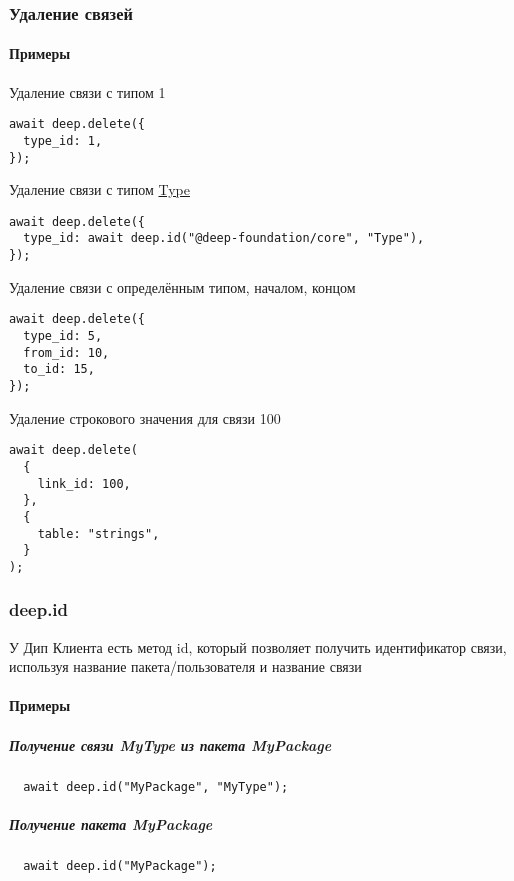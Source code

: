 \subsubsection{Удаление связей}

\paragraph{Примеры \\}

Удаление связи с типом 1

\leavevmode
\begin{lstlisting}
await deep.delete({
  type_id: 1,
});
\end{lstlisting}

Удаление связи с типом \hyperlink{Core.Type.Description}{Type}

\leavevmode
\begin{lstlisting}
await deep.delete({
  type_id: await deep.id("@deep-foundation/core", "Type"),
});
\end{lstlisting}

Удаление связи с определённым типом, началом, концом
\leavevmode
\begin{lstlisting}
await deep.delete({
  type_id: 5,
  from_id: 10,
  to_id: 15,
});
\end{lstlisting}

Удаление строкового значения для связи 100
\leavevmode
\begin{lstlisting}
await deep.delete(
  {
    link_id: 100,
  },
  {
    table: "strings",
  }
);
\end{lstlisting}

\subsubsection{deep.id}
У Дип Клиента есть метод id, который позволяет получить идентификатор связи,
используя название пакета/пользователя и название связи
\paragraph{Примеры}
\subparagraph{Получение связи MyType из пакета MyPackage}
\begin{lstlisting}
  await deep.id("MyPackage", "MyType");
\end{lstlisting}

\subparagraph{Получение пакета MyPackage}
\begin{lstlisting}
  await deep.id("MyPackage");
\end{lstlisting}

